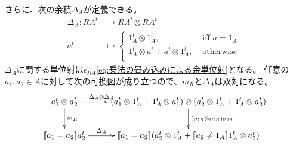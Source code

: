 	さらに、次の余積$\Delta_A$が定義できる。
	\begin{equation}\begin{split} %
		\Delta_A: RA^t &\to RA^t\otimes RA^t \\
		a^t &\mapsto \begin{cases} %
			1_A^t\otimes 1_A^t, &\text{ iff } a=1_A \\
			1_A^t\otimes a^t + a^t\otimes 1_A^t, &\text{ otherwise } \\
		\end{cases} %
	\end{split}\end{equation} %
	$\Delta_A$に関する単位射は$\epsilon_{RA}$\eqref{eq:乗法の畳み込みによる余単位射}となる。
	任意の$a_1,a_2\in A$に対して次の可換図が成り立つので、$m_R$と$\Delta_A$は双対になる。
	\begin{equation}\xymatrix{
		a_1^t\otimes a_2^t \ar[r]^(.3){\Delta_A\otimes \Delta_A} \ar[d]^{m_R}
		& (a_1^t\otimes 1_A^t+1_A^t\otimes a_1^t)\otimes (a_2^t\otimes 1_A^t+1_A^t\otimes a_2^t) \ar[d]^{(m_R\otimes m_R)\sigma_{23}} \\
		\jump{a_1=a_2}a_2^t \ar[r]^(.3){\Delta_A}
		& \jump{a_1=a_2}(a_2^t\otimes 1_A^t+\jump{a_2\neq 1_A}1_A^t\otimes a_2^t) \\
	}\end{equation}

